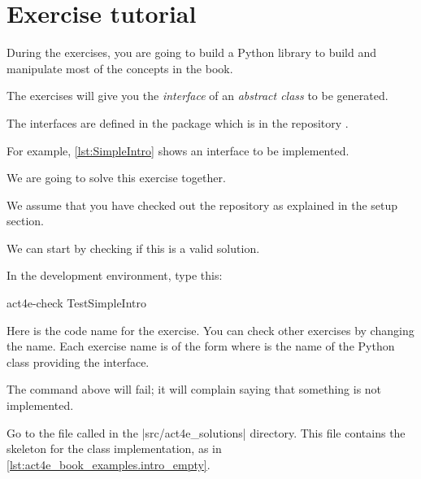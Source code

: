 
\section{Exercise tutorial}
\label{sec:exercise-tutorial}

During the exercises, you are going to build a Python library to build and manipulate most of the concepts in the book.

The exercises will give you the \emph{interface} of an \emph{abstract class} to be generated.

The interfaces are defined in the package  which is in the repository .
%

For example, \cref{lst:SimpleIntro} shows an interface  to be implemented.


We are going to solve this exercise together.

We assume that you have checked out the repository as explained in the setup section.


We can start by checking if this is a valid solution.

In the development environment, type this:

\begin{console}
    act4e-check TestSimpleIntro
\end{console}

Here  is the code name for the exercise.
You can check other exercises by changing the name.
Each exercise name is of the form  where  is the name of the Python class
providing the interface.

The command above will fail; it will complain saying that something is not implemented.

Go to the file called  in the \files|src/act4e_solutions| directory.
This file contains the skeleton for the class implementation, as in \cref{lst:act4e_book_examples.intro_empty}.

\begin{longcode}
    \caption{}

    \label{lst:act4e_book_examples.intro_empty}
\end{longcode}


